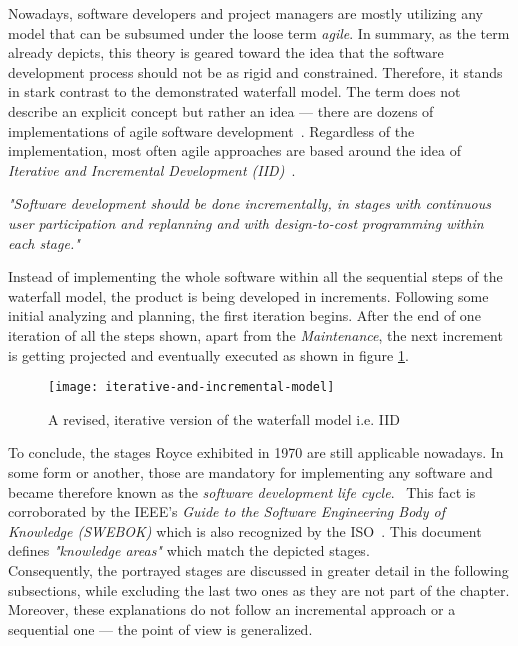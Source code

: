 \documentclass[12pt,a4paper,twoside]{report}
\begin{document}
Nowadays, software developers and project managers are mostly utilizing any model that
can be subsumed under the loose term \textit{agile}.
In summary, as the term already depicts, this theory is geared toward
the idea that the software development process should not be as rigid and constrained.
Therefore, it stands in stark contrast to the demonstrated waterfall model.
The term does not describe an explicit concept but rather an idea ---
there are dozens of implementations of agile software development~\cite{martin-agile-practices}.
Regardless of the implementation, most often agile approaches are based around
the idea of \textit{Iterative and Incremental Development (IID)}~\cite{larman-iid-history}.
\begin{displayquote}
\emph{"Software development should be done incrementally, in stages with
continuous user participation and replanning and
with design-to-cost programming within each stage."}~\cite{mills-iid}
\end{displayquote}
Instead of implementing the whole software within all the sequential steps
of the waterfall model, the product is being developed in increments.
Following some initial analyzing and planning, the first iteration begins.
After the end of one iteration of all the steps shown, apart from the \textit{Maintenance},
the next increment is getting projected and eventually executed as shown in figure \ref{fig:idd-model}.
\begin{figure}[htbp]
\centering
\texttt{[image: iterative-and-incremental-model]}
\caption{A revised, iterative version of the waterfall model i.e. IID}
\label{fig:idd-model}
\end{figure}

To conclude, the stages Royce exhibited in 1970 are still applicable nowadays.
In some form or another, those are mandatory for implementing any software
and became therefore known as the \textit{software development life cycle}.~\cite{se-ieee}
This fact is corroborated by the IEEE's
\textit{Guide to the Software Engineering Body of Knowledge (SWEBOK)}
which is also recognized by the ISO~\cite{swebok}.
This document defines \textit{"knowledge areas"} which match the depicted stages.\\
Consequently, the portrayed stages are discussed in greater detail in the following subsections,
while excluding the last two ones as they are not part of the
\textit{} chapter.
Moreover, these explanations do not follow an incremental approach
or a sequential one --- the point of view is generalized.
\end{document}

